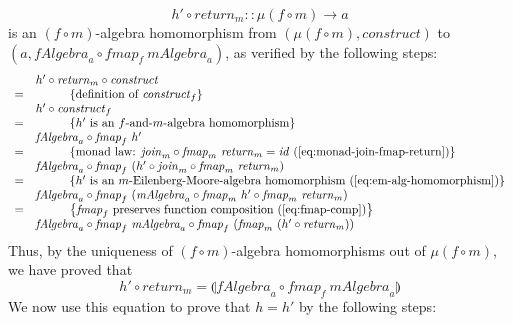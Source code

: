 \documentclass{jfp1}
\newcommand{\fold}[1]{\llparenthesis #1 \rrparenthesis}
\newcommand{\eqAnnotationS}[1]{\hspace{1cm}\left\{\textrm{#1}\right\}}
\begin{document}
\begin{proof*}
\begin{enumerate}
    \begin{displaymath}
      h' \circ \mathit{return}_m :: \mu(f \circ m) \to a
    \end{displaymath}
    is an $(f \circ m)$-algebra homomorphism
    from $(\mu(f \circ m), \mathit{construct})$ to $(a, \mathit{fAlgebra}_a
    \circ \mathit{fmap}_f~\mathit{mAlgebra}_a)$, as verified by the
    following steps:
    \begin{displaymath}
      \begin{array}{cl}
        & h' \circ \mathit{return}_m \circ \mathit{construct} \\
        =&\eqAnnotationS{definition of $\mathit{construct}_f$} \\
        & h' \circ \mathit{construct}_f \\
        =&\eqAnnotationS{$h'$ is an $f$-and-$m$-algebra homomorphism} \\
        & \mathit{fAlgebra}_a \circ \mathit{fmap}_f~h' \\
        =&\eqAnnotationS{monad law: $\mathit{join}_m \circ \mathit{fmap}_m~\mathit{return}_m = \mathit{id}$ (\autoref{eq:monad-join-fmap-return})} \\
        & \mathit{fAlgebra}_a \circ \mathit{fmap}_f~(h' \circ \mathit{join}_m \circ \mathit{fmap}_m~\mathit{return}_m) \\
        =&\eqAnnotationS{$h'$ is an $m$-Eilenberg-Moore-algebra homomorphism (\autoref{eq:em-alg-homomorphism})} \\
        & \mathit{fAlgebra}_a \circ \mathit{fmap}_f~(\mathit{mAlgebra}_a \circ \mathit{fmap}_m~h' \circ \mathit{fmap}_m~\mathit{return}_m) \\
        =&\eqAnnotationS{$\mathit{fmap}_f$ preserves function composition (\autoref{eq:fmap-comp})} \\
        & \mathit{fAlgebra}_a \circ \mathit{fmap}_f~\mathit{mAlgebra}_a \circ \mathit{fmap}_f~(\mathit{fmap}_m~(h' \circ \mathit{return}_m))
      \end{array}
    \end{displaymath}
    Thus, by the uniqueness of $(f \circ m)$-algebra homomorphisms out
    of $\mu(f \circ m)$, we have proved that 
    \begin{equation}\label{eq:h'-prop}
      h' \circ \mathit{return}_m = \fold{\mathit{fAlgebra}_a \circ \mathit{fmap}_f~\mathit{mAlgebra}_a}
    \end{equation}
    We now use this equation to prove that $h=h'$ by the following
    steps:
    \begin{displaymath}

\end{displaymath}
\end{enumerate}
\end{proof*}
\end{document}
